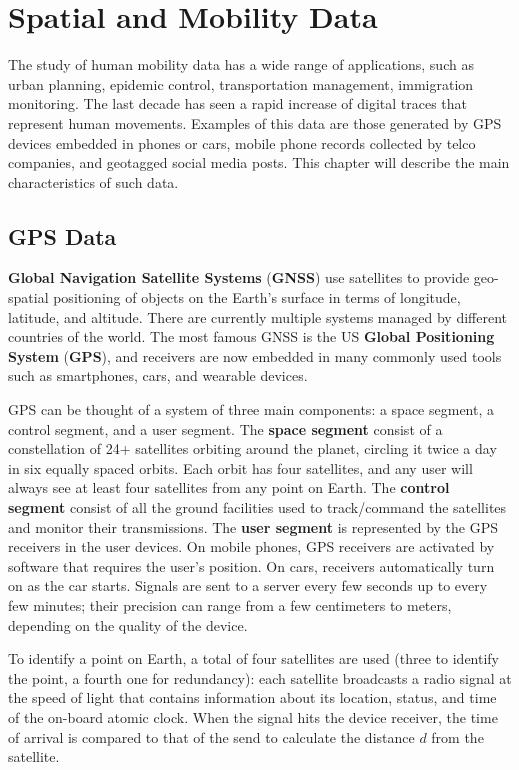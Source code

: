 \chapter{Spatial and Mobility Data}

The study of human mobility data has a wide range of applications, such as urban planning, epidemic control, transportation management, immigration monitoring. The last decade has seen a rapid increase of digital traces that represent human movements. Examples of this data are those generated by GPS devices embedded in phones or cars, mobile phone records collected by telco companies, and geotagged social media posts. This chapter will describe the main characteristics of such data.

\section{GPS Data}

\textbf{Global Navigation Satellite Systems} (\textbf{GNSS}) use satellites to provide geo-spatial positioning of objects on the Earth's surface in terms of longitude, latitude, and altitude. There are currently multiple systems managed by different countries of the world. The most famous GNSS is the US \textbf{Global Positioning System} (\textbf{GPS}), and receivers are now embedded in many commonly used tools such as smartphones, cars, and wearable devices. 

GPS can be thought of a system of three main components: a space segment, a control segment, and a user segment. The \textbf{space segment} consist of a constellation of 24+ satellites orbiting around the planet, circling it twice a day in six equally spaced orbits. Each orbit has four satellites, and any user will always see at least four satellites from any point on Earth. The \textbf{control segment} consist of all the ground facilities used to track/command the satellites and monitor their transmissions. The \textbf{user segment} is represented by the GPS receivers in the user devices. On mobile phones, GPS receivers are activated by software that requires the user's position. On cars, receivers automatically turn on as the car starts. Signals are sent to a server every few seconds up to every few minutes; their precision can range from a few centimeters to meters, depending on the quality of the device.

To identify a point on Earth, a total of four satellites are used (three to identify the point, a fourth one for redundancy): each satellite broadcasts a radio signal at the speed of light that contains information about its location, status, and time of the on-board atomic clock. When the signal hits the device receiver, the time of arrival is compared to that of the send to calculate the distance $d$ from the satellite.

